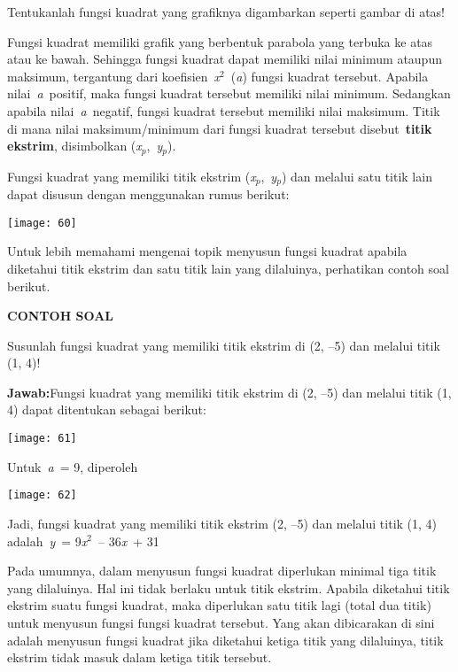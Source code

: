 \documentclass[11pt,fleqn]{book} %
\begin{document}
\noindent Tentukanlah fungsi kuadrat yang grafiknya digambarkan seperti gambar di atas!

Fungsi kuadrat memiliki grafik yang berbentuk parabola yang terbuka ke atas atau ke bawah. Sehingga fungsi kuadrat dapat memiliki nilai minimum ataupun maksimum, tergantung dari koefisien~\textit{x}${}^{2}$~(\textit{a}) fungsi kuadrat tersebut. Apabila nilai~\textit{a}~positif, maka fungsi kuadrat tersebut memiliki nilai minimum. Sedangkan apabila nilai~\textit{a}~negatif, fungsi kuadrat tersebut memiliki nilai maksimum. Titik di mana nilai maksimum/minimum dari fungsi kuadrat tersebut disebut~\textbf{titik ekstrim}, disimbolkan (\textit{x}${}_{p}$,~\textit{y}${}_{p}$).

\noindent Fungsi kuadrat yang memiliki titik ekstrim (\textit{x}${}_{p}$,~\textit{y}${}_{p}$) dan melalui satu titik lain dapat disusun dengan menggunakan rumus berikut:

\begin{center}
\noindent \texttt{[image: 60]}
\end{center}

\noindent Untuk lebih memahami mengenai topik menyusun fungsi kuadrat apabila diketahui titik ekstrim dan satu titik lain yang dilaluinya, perhatikan contoh soal berikut.

\noindent \textbf{CONTOH SOAL}

\noindent Susunlah fungsi kuadrat yang memiliki titik ekstrim di (2, --5) dan melalui titik (1, 4)!

\noindent \textbf{Jawab:}Fungsi kuadrat yang memiliki titik ekstrim di (2, --5) dan melalui titik (1, 4) dapat ditentukan sebagai berikut:

\begin{center}
\noindent \texttt{[image: 61]}
\end{center}

\noindent Untuk~\textit{a}~= 9, diperoleh

\begin{center}
\noindent \texttt{[image: 62]}
\end{center}

\noindent Jadi, fungsi kuadrat yang memiliki titik ekstrim (2, --5) dan melalui titik (1, 4) adalah~\textit{y}~= 9\textit{x}${}^{2}$~-- 36\textit{x}~+ 31

\noindent \eject 

Pada umumnya, dalam menyusun fungsi kuadrat diperlukan minimal tiga titik yang dilaluinya. Hal ini tidak berlaku untuk titik ekstrim. Apabila diketahui titik ekstrim suatu fungsi kuadrat, maka diperlukan satu titik lagi (total dua titik) untuk menyusun fungsi fungsi kuadrat tersebut. Yang akan dibicarakan di sini adalah menyusun fungsi kuadrat jika diketahui ketiga titik yang dilaluinya, titik ekstrim tidak masuk dalam ketiga titik tersebut.
\end{document}
